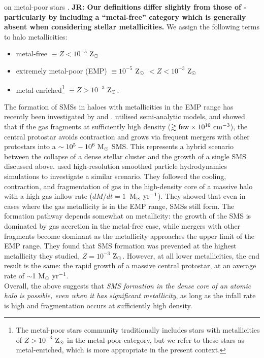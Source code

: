 \documentclass[twocolumn,iop,revtex4]{openjournal}
\newcommand{\msolaryrc} {$\rm{M_{\odot}~yr^{-1}}$}
\newcommand{\zsolar} {$\rm{Z_{\odot}}~$}
\newcommand{\zsolarc} {$\rm{Z_{\odot}}$}
\def\jr#1{{\color{blue} \bf JR:  #1}}
\begin{document}
on metal-poor stars \citep[e.g.][]{Frebel_2015}. \jr{Our definitions differ slightly from those of
\cite{Frebel_2015} - particularly by including a ``metal-free'' category which is generally
absent when considering stellar metallicities.} We assign the following terms to halo metallicities:
\begin{itemize}
\item metal-free $\equiv Z < 10^{-5}$ \zsolarc 
\item extremely metal-poor (EMP) $\equiv 10^{-5}$ \zsolar $< Z < 10^{-3}$ \zsolarc 
\item metal-enriched\footnote{The metal-poor stars community traditionally includes stars with
  metallicities of $Z > 10^{-3}$ \zsolar in the metal-poor category, but we refer to these stars as metal-enriched, which 
  is more appropriate in the present context.} $\equiv Z > 10^{-3}$ \zsolarc.
\end{itemize}
  The formation of SMSs in haloes with metallicities in the EMP range
  has recently been investigated by \cite{Tagawa_2020} and \cite{Chon_2020}. \cite{Tagawa_2020}  utilised semi-analytic models, and showed that if the gas fragments at sufficiently high density ($\gtrsim {\rm few}\times 10^{10}~{\rm cm^{-3}}$), the central protostar avoids contraction and  grows via frequent mergers with other protostars into a $\sim 10^5-10^6~{\rm M_\odot}$ SMS. This represents a hybrid scenario between the collapse of a dense stellar cluster and the growth of a single SMS discussed above.
   \cite{Chon_2020} used high-resolution smoothed particle
  hydrodynamics simulations to investigate a similar scenario. They followed the cooling, contraction, and fragmentation of gas in the high-density core of a massive halo with a high gas inflow rate ($dM/dt=1$~\msolaryrc).  They showed that even in cases where the gas metallicity is in the EMP range, SMSs still form. The formation pathway depends somewhat on metallicity: the growth of the SMS is dominated by gas accretion in the metal-free case, while mergers with other fragments become dominant as the metallicity approaches the upper limit of the EMP range. They found that SMS formation was prevented at the highest metallicity they studied, $Z=10^{-3}$ \zsolarc. However, at all lower metallicities, the end result is the same: the rapid growth of a massive central protostar, at an average rate of $\sim$1 \msolaryrc.\\
  \indent Overall, the above suggests that {\em SMS formation in the dense core of an atomic halo is possible,
    even when it has significant metallicity}, as long as the infall rate is high and fragmentation occurs at sufficiently high density.
\end{document}
